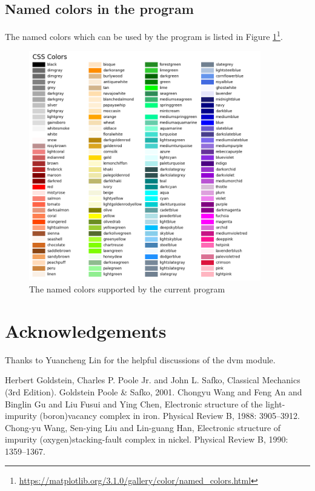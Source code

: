 \documentclass[12pt]{book}
\begin{document}
\section{\label{sec:supp}Named colors in the program}
The named colors which can be used by the program is listed in Figure \ref{fig:named_colors}\footnote{\url{https://matplotlib.org/3.1.0/gallery/color/named_colors.html}}.
\begin{figure}[htbp]
\centering
\includegraphics[width=0.9\textwidth]{named_colors.pdf}
\caption{The named colors supported by the current program}
\label{fig:named_colors}
\end{figure}



\chapter*{Acknowledgements}
Thanks to Yuancheng Lin for the helpful discussions of the dvm module.

\begin{thebibliography}{99}
 Herbert Goldstein, Charles P. Poole Jr. and John L. Safko, Classical Mechanics (3rd Edition). Goldstein Poole \& Safko, 2001.
 Chongyu Wang and Feng An and Binglin Gu and Liu Fusui and Ying Chen, Electronic structure of the light-impurity (boron){\textendash}vacancy complex in iron. Physical Review B, 1988: 3905--3912.
 Chong-yu Wang, Sen-ying Liu and Lin-guang Han, Electronic structure of impurity (oxygen){\textendash}stacking-fault complex in nickel. Physical Review B, 1990: 1359--1367.
\end{thebibliography}
\end{document}
